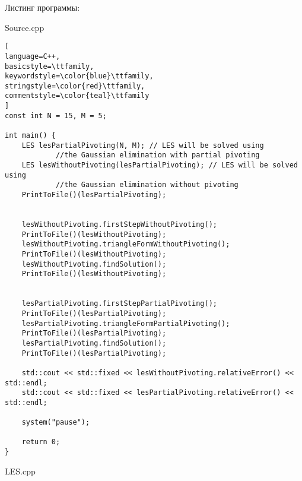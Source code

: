 \documentclass[a4paper, 12pt]{article}
\begin{document}
\normalsize Листинг программы:

Source.cpp

\scriptsize
\begin{lstlisting}[
language=C++,
basicstyle=\ttfamily,
keywordstyle=\color{blue}\ttfamily,
stringstyle=\color{red}\ttfamily,
commentstyle=\color{teal}\ttfamily
]
const int N = 15, M = 5;

int main() {
	LES lesPartialPivoting(N, M); // LES will be solved using 
			//the Gaussian elimination with partial pivoting
	LES lesWithoutPivoting(lesPartialPivoting); // LES will be solved using 
			//the Gaussian elimination without pivoting
	PrintToFile()(lesPartialPivoting);
	
	
	lesWithoutPivoting.firstStepWithoutPivoting();
	PrintToFile()(lesWithoutPivoting);
	lesWithoutPivoting.triangleFormWithoutPivoting();
	PrintToFile()(lesWithoutPivoting);
	lesWithoutPivoting.findSolution();
	PrintToFile()(lesWithoutPivoting);
	
	
	lesPartialPivoting.firstStepPartialPivoting();
	PrintToFile()(lesPartialPivoting);
	lesPartialPivoting.triangleFormPartialPivoting();
	PrintToFile()(lesPartialPivoting);
	lesPartialPivoting.findSolution(); 
	PrintToFile()(lesPartialPivoting);
	
	std::cout << std::fixed << lesWithoutPivoting.relativeError() << std::endl;
	std::cout << std::fixed << lesPartialPivoting.relativeError() << std::endl;
	
	system("pause");
	
	return 0;
}
\end{lstlisting}

\normalsize LES.cpp
\end{document}
